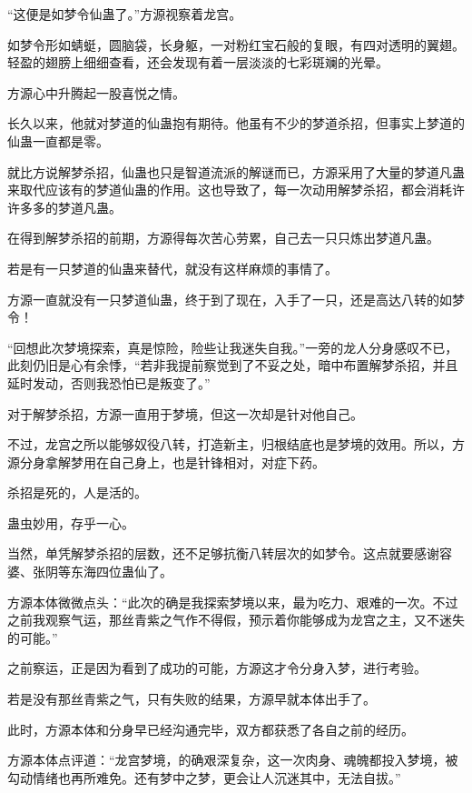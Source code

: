 
\begin{this_body}



“这便是如梦令仙蛊了。”方源视察着龙宫。

如梦令形如蜻蜓，圆脑袋，长身躯，一对粉红宝石般的复眼，有四对透明的翼翅。轻盈的翅膀上细细查看，还会发现有着一层淡淡的七彩斑斓的光晕。

方源心中升腾起一股喜悦之情。

长久以来，他就对梦道的仙蛊抱有期待。他虽有不少的梦道杀招，但事实上梦道的仙蛊一直都是零。

就比方说解梦杀招，仙蛊也只是智道流派的解谜而已，方源采用了大量的梦道凡蛊来取代应该有的梦道仙蛊的作用。这也导致了，每一次动用解梦杀招，都会消耗许许多多的梦道凡蛊。

在得到解梦杀招的前期，方源得每次苦心劳累，自己去一只只炼出梦道凡蛊。

若是有一只梦道的仙蛊来替代，就没有这样麻烦的事情了。

方源一直就没有一只梦道仙蛊，终于到了现在，入手了一只，还是高达八转的如梦令！

“回想此次梦境探索，真是惊险，险些让我迷失自我。”一旁的龙人分身感叹不已，此刻仍旧是心有余悸，“若非我提前察觉到了不妥之处，暗中布置解梦杀招，并且延时发动，否则我恐怕已是叛变了。”

对于解梦杀招，方源一直用于梦境，但这一次却是针对他自己。

不过，龙宫之所以能够奴役八转，打造新主，归根结底也是梦境的效用。所以，方源分身拿解梦用在自己身上，也是针锋相对，对症下药。

杀招是死的，人是活的。

蛊虫妙用，存乎一心。

当然，单凭解梦杀招的层数，还不足够抗衡八转层次的如梦令。这点就要感谢容婆、张阴等东海四位蛊仙了。

方源本体微微点头：“此次的确是我探索梦境以来，最为吃力、艰难的一次。不过之前我观察气运，那丝青紫之气作不得假，预示着你能够成为龙宫之主，又不迷失的可能。”

之前察运，正是因为看到了成功的可能，方源这才令分身入梦，进行考验。

若是没有那丝青紫之气，只有失败的结果，方源早就本体出手了。

此时，方源本体和分身早已经沟通完毕，双方都获悉了各自之前的经历。

方源本体点评道：“龙宫梦境，的确艰深复杂，这一次肉身、魂魄都投入梦境，被勾动情绪也再所难免。还有梦中之梦，更会让人沉迷其中，无法自拔。”


\end{this_body}
